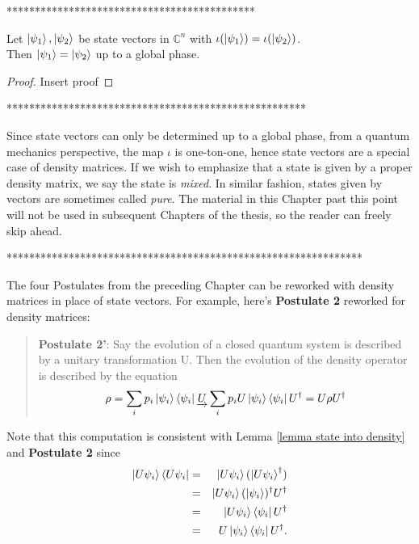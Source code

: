 ********************************************

\begin{lemma}
\label{lemma state into density}
Let $\ket{\psi_1}, \ket{\psi_2}$ be state vectors in ${\mathbb{C}}^n$ with $\iota({\ket{\psi_1}})=\iota(\ket{\psi_2})$.\\
Then $\ket{\psi_1}=\ket{\psi_2}$ up to a global phase.
\end{lemma}
\begin{proof}
Insert proof
\end{proof}

*****************************************************

Since state vectors can only be determined up to a global phase, from a quantum mechanics perspective, the map $\iota$ is one-ton-one, hence state vectors are a special case of density matrices.  If we wish to emphasize that a state is given by a proper density matrix, we say the state is \textit{mixed}.  In similar fashion, states given by vectors are sometimes called {\emph{pure}}.  The material in this Chapter past this point will not be used in subsequent Chapters of the thesis, so the reader can freely skip ahead.


***************************************************************

The four Postulates from the preceding Chapter can be reworked with density matrices in place of state vectors. For example, here's \textbf{Postulate 2} reworked for density matrices:
\begin{quote}
    {\bf{Postulate 2'}}: Say the evolution of a closed quantum system is described by a unitary transformation U. Then the evolution of the density operator is described by the equation
    \begin{equation}
        \rho=\sum_i p_i \ket{\psi_i}\bra{\psi_i}	\underrightarrow{U}\sum_i p_i U \ket{\psi_i}\bra{\psi_i}U^\dagger=U \rho U^\dagger
    \end{equation}
\end{quote}

Note that this computation is consistent with Lemma \ref{lemma state into density} and {\bf{Postulate 2}} since
\begin{eqnarray}
\ket{U \psi_i}\bra{U \psi_i}&=& \ket{U \psi_i}(\ket{U \psi_i}^\dagger)\\
&=& \ket{U\psi_i}(\ket{\psi_i})^\dagger U^\dagger\\
&=& \ket{U \psi_i} \bra{\psi_i}U^\dagger\\
&=& U \ket{\psi_i}\bra{\psi_i}U^\dagger.
\end{eqnarray}

